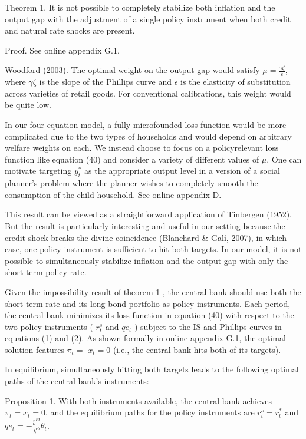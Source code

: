 \documentclass[10pt]{article}
\begin{document}
Theorem 1. It is not possible to completely stabilize both inflation and the output gap with the adjustment of a single policy instrument when both credit and natural rate shocks are present.

Proof. See online appendix G.1.

Woodford (2003). The optimal weight on the output gap would satisfy $\mu=\frac{\gamma \zeta}{\epsilon}$, where $\gamma \zeta$ is the slope of the Phillips curve and $\epsilon$ is the elasticity of substitution across varieties of retail goods. For conventional calibrations, this weight would be quite low.

In our four-equation model, a fully microfounded loss function would be more complicated due to the two types of households and would depend on arbitrary welfare weights on each. We instead choose to focus on a policyrelevant loss function like equation (40) and consider a variety of different values of $\mu$. One can motivate targeting $y_{t}^{*}$ as the appropriate output level in a version of a social planner's problem where the planner wishes to completely smooth the consumption of the child household. See online appendix D.

This result can be viewed as a straightforward application of Tinbergen (1952). But the result is particularly interesting and useful in our setting because the credit shock breaks the divine coincidence (Blanchard \& Galí, 2007), in which case, one policy instrument is sufficient to hit both targets. In our model, it is not possible to simultaneously stabilize inflation and the output gap with only the short-term policy rate.

Given the impossibility result of theorem 1 , the central bank should use both the short-term rate and its long bond portfolio as policy instruments. Each period, the central bank minimizes its loss function in equation (40) with respect to the two policy instruments ( $r_{t}^{s}$ and $q e_{t}$ ) subject to the IS and Phillips curves in equations (1) and (2). As shown formally in online appendix G.1, the optimal solution features $\pi_{t}=$ $x_{t}=0$ (i.e., the central bank hits both of its targets).

In equilibrium, simultaneously hitting both targets leads to the following optimal paths of the central bank's instruments:

Proposition 1. With both instruments available, the central bank achieves $\pi_{t}=x_{t}=0$, and the equilibrium paths for the policy instruments are $r_{t}^{s}=r_{t}^{*}$ and $q e_{t}=-\frac{\bar{b}^{F I}}{\bar{b}^{c b}} \theta_{t}$.
\end{document}
